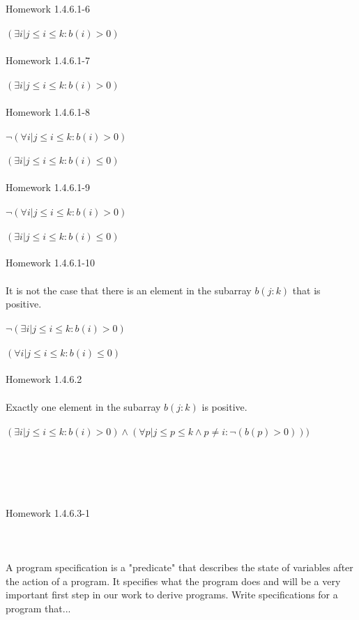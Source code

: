 \documentclass[11pt]{article}
\begin{document}
Homework 1.4.6.1-6
\\
\\
$(\exists i|j \leq i \leq k : b(i) > 0)$
\\
\\
Homework 1.4.6.1-7
\\
\\
$(\exists i | j \leq i \leq k : b(i) > 0)$
\\
\\
Homework 1.4.6.1-8
\\
\\
$\neg(\forall i | j \leq i \leq k : b(i) > 0)$
\\
\\
$(\exists i| j \leq i \leq k : b(i) \leq 0)$
\\
\\
Homework 1.4.6.1-9
\\
\\
$\neg(\forall i| j \leq i \leq k : b(i) > 0)$
\\
\\
$(\exists i | j \leq i \leq k : b(i) \leq 0)$
\\
\\
Homework 1.4.6.1-10
\\
\\
It is not the case that there is an element in the subarray $b(j:k)$ that is positive.
\\
\\
$\neg(\exists i| j \leq i \leq k : b(i) > 0)$
\\
\\
$(\forall i | j \leq i \leq k : b(i) \leq 0)$
\\
\\
Homework 1.4.6.2
\\
\\
Exactly one element in the subarray $b(j:k)$ is positive.
\\
\\
$(\exists i| j \leq i \leq k : b(i) > 0) \land (\forall p | j \leq p \leq k \land p \neq i : \neg (b(p) > 0)))$
\\
\\
\\
\\
\\
\\
Homework 1.4.6.3-1
\\
\\
\\
\\
A program specification is a "predicate" that describes the state of variables after the action of a program. It specifies what the program does and will be a very important first step in our work to derive programs. Write specifications for a program that...
\end{document}
